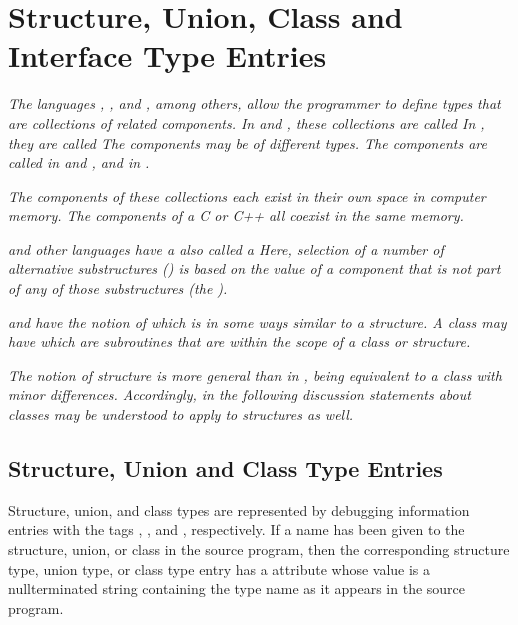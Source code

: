 \section{Structure, Union, Class and Interface Type Entries}
\label{chap:structureunionclassandinterfacetypeentries}

\textit{The languages 
, 
, and 
, among others, allow the
programmer to define types that are collections of related
components. 
In  and , these collections are called
In , they are called 
The components may be of different types. The components are
called  in  and 
, and  in .}

\textit{The components of these collections each exist in their
own space in computer memory. The components of a C or C++
 all coexist in the same memory.}

\textit{ and 
other languages have a 
also called a  Here, selection of a
number of alternative substructures () is based
on the value of a component that is not part of any of those
substructures (the ).}

\textit{ and 
 have the notion of  which is in some
ways similar to a structure. A class may have  which are subroutines that are within the scope
of a class or structure.}

\textit{The  notion of 
structure is more general than in , being
equivalent to a class with minor differences. Accordingly,
in the following discussion statements about 
 classes may
be understood to apply to  structures as well.}

\subsection{Structure, Union and Class Type Entries}
\label{chap:structureunionandclasstypeentries}


Structure, union, and class types are represented by debugging
information entries 
with 
the tags 
,
, 
and ,
respectively. If a name has been given to the structure,
union, or class in the source program, then the corresponding
structure type, union type, or class type entry has a
 attribute 
whose value is a null\dash terminated string
containing the type name as it appears in the source program.


